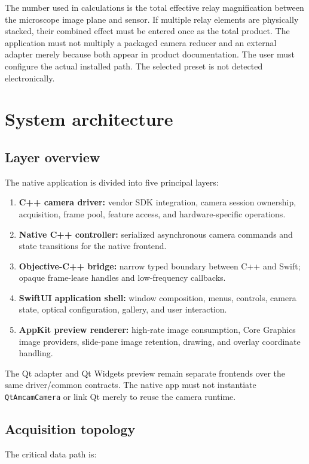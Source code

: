 \documentclass[11pt,a4paper,oneside]{article}
\newcommand{\code}[1]{\texttt{\small #1}}
\begin{document}
The number used in calculations is the total effective relay magnification between the microscope image plane and sensor. If multiple relay elements are physically stacked, their combined effect must be entered once as the total product. The application must not multiply a packaged camera reducer and an external adapter merely because both appear in product documentation. The user must configure the actual installed path. The selected preset is not detected electronically.

\section{System architecture}

\subsection{Layer overview}
The native application is divided into five principal layers:
\begin{enumerate}
  \item \textbf{C++ camera driver:} vendor SDK integration, camera session ownership, acquisition, frame pool, feature access, and hardware-specific operations.
  \item \textbf{Native C++ controller:} serialized asynchronous camera commands and state transitions for the native frontend.
  \item \textbf{Objective-C++ bridge:} narrow typed boundary between C++ and Swift; opaque frame-lease handles and low-frequency callbacks.
  \item \textbf{SwiftUI application shell:} window composition, menus, controls, camera state, optical configuration, gallery, and user interaction.
  \item \textbf{AppKit preview renderer:} high-rate image consumption, Core Graphics image providers, slide-pane image retention, drawing, and overlay coordinate handling.
\end{enumerate}

The Qt adapter and Qt Widgets preview remain separate frontends over the same driver/common contracts. The native app must not instantiate \code{QtAmcamCamera} or link Qt merely to reuse the camera runtime.

\subsection{Acquisition topology}
The critical data path is:
\end{document}
